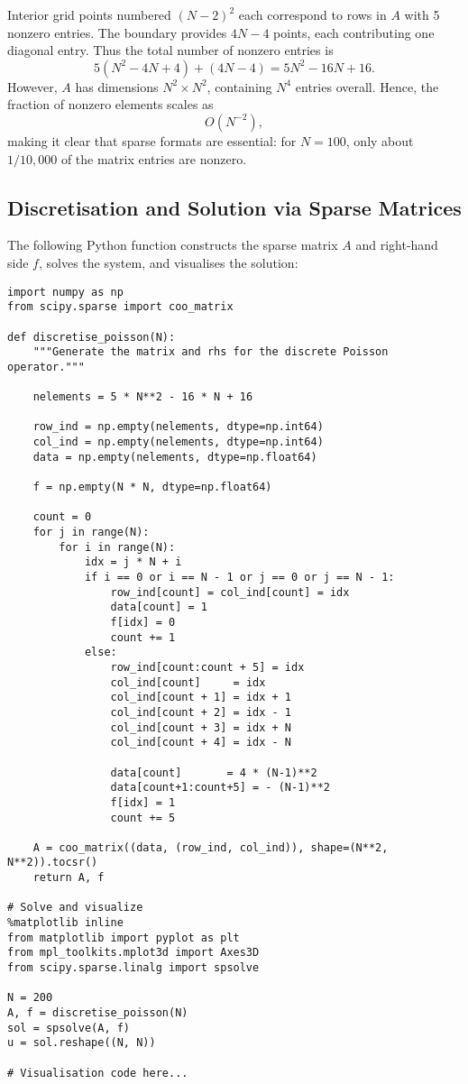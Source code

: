 \documentclass[11pt,a4paper]{book}
\begin{document}
Interior grid points numbered \((N-2)^2\) each correspond to rows in \(A\) with 5 nonzero entries. The boundary provides \(4N-4\) points, each contributing one diagonal entry. Thus the total number of nonzero entries is
\[
5 (N^2 - 4N + 4) + (4N - 4) = 5N^2 - 16N + 16.
\]
However, \(A\) has dimensions \(N^2 \times N^2\), containing \(N^4\) entries overall. Hence, the fraction of nonzero elements scales as
\[
O\!\left(N^{-2}\right),
\]
making it clear that sparse formats are essential: for \(N = 100\), only about \(1/10{,}000\) of the matrix entries are nonzero.

\subsection*{Discretisation and Solution via Sparse Matrices}

The following Python function constructs the sparse matrix \(A\) and right-hand side \(f\), solves the system, and visualises the solution:

\begin{lstlisting}
import numpy as np
from scipy.sparse import coo_matrix

def discretise_poisson(N):
    """Generate the matrix and rhs for the discrete Poisson operator."""

    nelements = 5 * N**2 - 16 * N + 16

    row_ind = np.empty(nelements, dtype=np.int64)
    col_ind = np.empty(nelements, dtype=np.int64)
    data = np.empty(nelements, dtype=np.float64)

    f = np.empty(N * N, dtype=np.float64)

    count = 0
    for j in range(N):
        for i in range(N):
            idx = j * N + i
            if i == 0 or i == N - 1 or j == 0 or j == N - 1:
                row_ind[count] = col_ind[count] = idx
                data[count] = 1
                f[idx] = 0
                count += 1
            else:
                row_ind[count:count + 5] = idx
                col_ind[count]     = idx
                col_ind[count + 1] = idx + 1
                col_ind[count + 2] = idx - 1
                col_ind[count + 3] = idx + N
                col_ind[count + 4] = idx - N

                data[count]       = 4 * (N-1)**2
                data[count+1:count+5] = - (N-1)**2
                f[idx] = 1
                count += 5

    A = coo_matrix((data, (row_ind, col_ind)), shape=(N**2, N**2)).tocsr()
    return A, f

# Solve and visualize
%matplotlib inline
from matplotlib import pyplot as plt
from mpl_toolkits.mplot3d import Axes3D
from scipy.sparse.linalg import spsolve

N = 200
A, f = discretise_poisson(N)
sol = spsolve(A, f)
u = sol.reshape((N, N))

# Visualisation code here...
\end{lstlisting}
\end{document}
